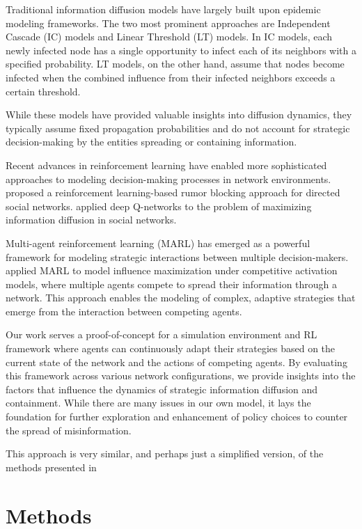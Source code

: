 \documentclass[12pt]{article}
\begin{document}
Traditional information diffusion models have largely built upon epidemic modeling frameworks. The two most prominent approaches are Independent Cascade (IC) models and Linear Threshold (LT) models. In IC models, each newly infected node has a single opportunity to infect each of its neighbors with a specified probability. LT models, on the other hand, assume that nodes become infected when the combined influence from their infected neighbors exceeds a certain threshold.

While these models have provided valuable insights into diffusion dynamics, they typically assume fixed propagation probabilities and do not account for strategic decision-making by the entities spreading or containing information.

Recent advances in reinforcement learning have enabled more sophisticated approaches to modeling decision-making processes in network environments. \citet{he2022reinforcement} proposed a reinforcement learning-based rumor blocking approach for directed social networks. \citet{chen2019reinforcement} applied deep Q-networks to the problem of maximizing information diffusion in social networks.

Multi-agent reinforcement learning (MARL) has emerged as a powerful framework for modeling strategic interactions between multiple decision-makers. \citet{qipeng2021influence} applied MARL to model influence maximization under competitive activation models, where multiple agents compete to spread their information through a network. This approach enables the modeling of complex, adaptive strategies that emerge from the interaction between competing agents.

Our work serves a proof-of-concept for a simulation environment and RL framework  where agents can continuously adapt their strategies based on the current state of the network and the actions of competing agents. By evaluating this framework across various network configurations, we provide insights into the factors that influence the dynamics of strategic information diffusion and containment. While there are many issues in our own model, it lays the foundation for further exploration and enhancement of policy choices to counter the spread of misinformation. 

This approach is very similar, and perhaps just a simplified version, of the methods presented in \citet{wijayanto2019effective}
\section{Methods}
\end{document}
